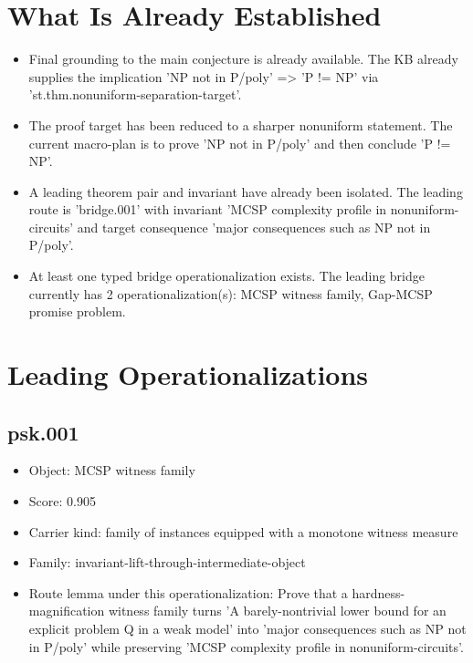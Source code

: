 \documentclass[11pt]{article}
\begin{document}
\section{What Is Already Established}
\begin{itemize}[leftmargin=*,itemsep=0.2em]
\item Final grounding to the main conjecture is already available. The KB already supplies the implication 'NP not in P/poly' => 'P != NP' via 'st.thm.nonuniform-separation-target'.
\item The proof target has been reduced to a sharper nonuniform statement. The current macro-plan is to prove 'NP not in P/poly' and then conclude 'P != NP'.
\item A leading theorem pair and invariant have already been isolated. The leading route is 'bridge.001' with invariant 'MCSP complexity profile in nonuniform-circuits' and target consequence 'major consequences such as NP not in P/poly'.
\item At least one typed bridge operationalization exists. The leading bridge currently has 2 operationalization(s): MCSP witness family, Gap-MCSP promise problem.
\end{itemize}

\section{Leading Operationalizations}
\subsection*{psk.001}
\begin{itemize}[leftmargin=*,itemsep=0.2em]
\item Object: MCSP witness family
\item Score: 0.905
\item Carrier kind: family of instances equipped with a monotone witness measure
\item Family: invariant-lift-through-intermediate-object
\item Route lemma under this operationalization: Prove that a hardness-magnification witness family turns 'A barely-nontrivial lower bound for an explicit problem Q in a weak model' into 'major consequences such as NP not in P/poly' while preserving 'MCSP complexity profile in nonuniform-circuits'.
\end{itemize}
\end{document}

